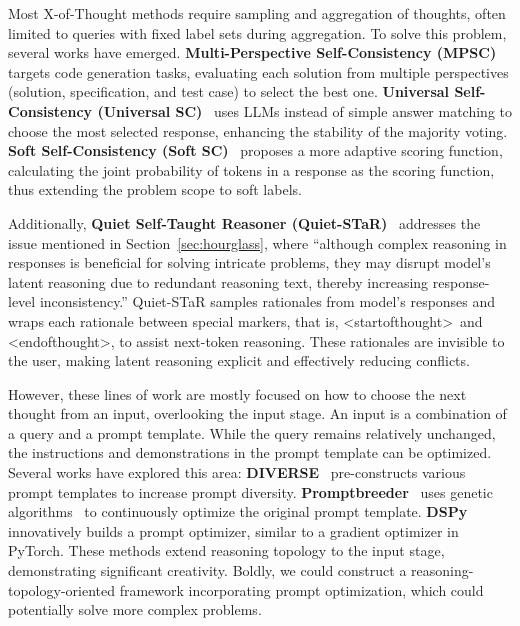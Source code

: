 \documentclass[lettersize,journal]{IEEEtran}
\begin{document}
Most X-of-Thought methods require sampling and aggregation of thoughts, often limited to queries with fixed label sets during aggregation. To solve this problem, several works have emerged. \textbf{Multi-Perspective Self-Consistency (MPSC)}~\cite{MPSC_23_arXiv_PKU} targets code generation tasks, evaluating each solution from multiple perspectives (solution, specification, and test case) to select the best one. \textbf{Universal Self-Consistency (Universal SC)}~\cite{UniversalSelfConsistency_23_arXiv_Google} uses LLMs instead of simple answer matching to choose the most selected response, enhancing the stability of the majority voting. \textbf{Soft Self-Consistency (Soft SC)}~\cite{SoftSelfConsistency_24_arXiv_UNCChapel} proposes a more adaptive scoring function, calculating the joint probability of tokens in a response as the scoring function, thus extending the problem scope to soft labels.

Additionally, \textbf{Quiet Self-Taught Reasoner (Quiet-STaR)}~\cite{QuietSTaR_24_arXiv_Stanford} addresses the issue mentioned in Section~\ref{sec:hourglass}, where ``although complex reasoning in responses is beneficial for solving intricate problems, they may disrupt model's latent reasoning due to redundant reasoning text, thereby increasing response-level inconsistency.'' Quiet-STaR samples rationales from model's responses and wraps each rationale between special markers, that is, \textless \textbar startofthought\textbar\textgreater\ and \textless \textbar endofthought\textbar\textgreater, to assist next-token reasoning. These rationales are invisible to the user, making latent reasoning explicit and effectively reducing conflicts.

However, these lines of work are mostly focused on how to choose the next thought from an input, overlooking the input stage. An input is a combination of a query and a prompt template. While the query remains relatively unchanged, the instructions and demonstrations in the prompt template can be optimized. Several works have explored this area: \textbf{DIVERSE}~\cite{SelfTeach_23_ACL_PKU} pre-constructs various prompt templates to increase prompt diversity. \textbf{Promptbreeder}~\cite{Promptbreeder_23_arXiv_DeepMind} uses genetic algorithms~\cite{genetic_algorithm} to continuously optimize the original prompt template. \textbf{DSPy}~\cite{DSPy_24_ICLR_Stanford} innovatively builds a prompt optimizer, similar to a gradient optimizer in PyTorch. These methods extend reasoning topology to the input stage, demonstrating significant creativity. Boldly, we could construct a reasoning-topology-oriented framework incorporating prompt optimization, which could potentially solve more complex problems.
\end{document}
